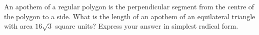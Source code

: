 An apothem of a regular polygon is the perpendicular segment from the centre of the polygon to a side. What is the length of an apothem of an equilateral triangle with area $16\sqrt3$ square units? Express your answer in simplest radical form.
